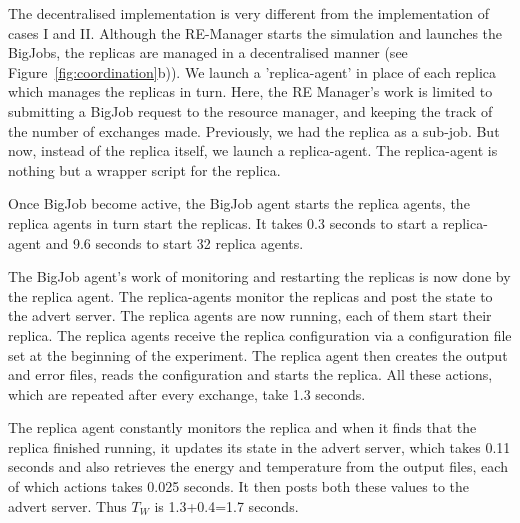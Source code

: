 \documentclass{rspublic}
\begin{document}
The decentralised implementation is very different from the implementation 
of cases I and II. Although the RE-Manager starts the simulation and launches 
the BigJobs, the replicas are managed in a decentralised manner 
(see Figure~\ref{fig:coordination}b)). We launch
a 'replica-agent' in place of each replica which manages the replicas in turn.
Here, the RE Manager's work is limited to submitting a BigJob request to the 
resource manager, and keeping the track of the number of exchanges made. 
Previously, we had the replica as a sub-job. But now, instead of the replica itself, 
we launch a replica-agent.
The replica-agent is nothing but a wrapper script for the replica. 

Once BigJob become active, the BigJob agent starts the replica agents, 
the replica agents in turn start the replicas. It takes 0.3 seconds to start a replica-agent and 9.6 seconds to start 32 replica agents. %

 The BigJob agent's work of
monitoring and restarting the replicas is now done by the replica agent. The replica-agents 
monitor the replicas and post the state to the advert server.
The replica agents are now running, each of them start their replica. The replica agents receive the replica configuration via a configuration file set at the beginning of the experiment. The replica agent then creates the output and error files, reads the configuration and starts the replica. All these actions, which are repeated after every exchange, take 1.3 seconds.

The replica agent constantly monitors the replica and when it finds that the replica finished running, it updates its state in the advert server, which takes 0.11 seconds and also retrieves the energy and temperature from the output files, each of which actions takes 0.025 seconds. It then posts both these values to the advert server. Thus $T_W$ is 1.3+0.4=1.7 seconds.
\end{document}
